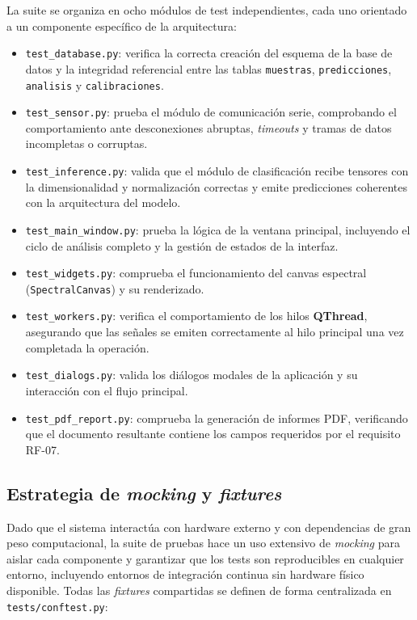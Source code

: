 La suite se organiza en ocho módulos de test independientes, cada uno
orientado a un componente específico de la arquitectura:

\begin{itemize}
    \item \texttt{test\_database.py}: verifica la correcta creación del
    esquema de la base de datos y la integridad referencial entre las
    tablas \texttt{muestras}, \texttt{predicciones}, \texttt{analisis}
    y \texttt{calibraciones}.
    \item \texttt{test\_sensor.py}: prueba el módulo de comunicación
    serie, comprobando el comportamiento ante desconexiones abruptas,
    \textit{timeouts} y tramas de datos incompletas o corruptas.
    \item \texttt{test\_inference.py}: valida que el módulo de
    clasificación recibe tensores con la dimensionalidad y normalización
    correctas y emite predicciones coherentes con la arquitectura del
    modelo.
    \item \texttt{test\_main\_window.py}: prueba la lógica de la ventana
    principal, incluyendo el ciclo de análisis completo y la gestión
    de estados de la interfaz.
    \item \texttt{test\_widgets.py}: comprueba el funcionamiento del
    canvas espectral (\texttt{SpectralCanvas}) y su renderizado.
    \item \texttt{test\_workers.py}: verifica el comportamiento de los
    hilos \textbf{QThread}, asegurando que las señales se emiten
    correctamente al hilo principal una vez completada la operación.
    \item \texttt{test\_dialogs.py}: valida los diálogos modales de la
    aplicación y su interacción con el flujo principal.
    \item \texttt{test\_pdf\_report.py}: comprueba la generación de
    informes PDF, verificando que el documento resultante contiene los
    campos requeridos por el requisito RF-07.
\end{itemize}

\subsection*{Estrategia de \textit{mocking} y \textit{fixtures}}

Dado que el sistema interactúa con hardware externo y con dependencias
de gran peso computacional, la suite de pruebas hace un uso extensivo
de \textit{mocking\cite{fowler2007mocks}} para aislar cada componente y garantizar que los
tests son reproducibles en cualquier entorno, incluyendo entornos de
integración continua sin hardware físico disponible. Todas las
\textit{fixtures} compartidas se definen de forma centralizada en
\texttt{tests/conftest.py}:

